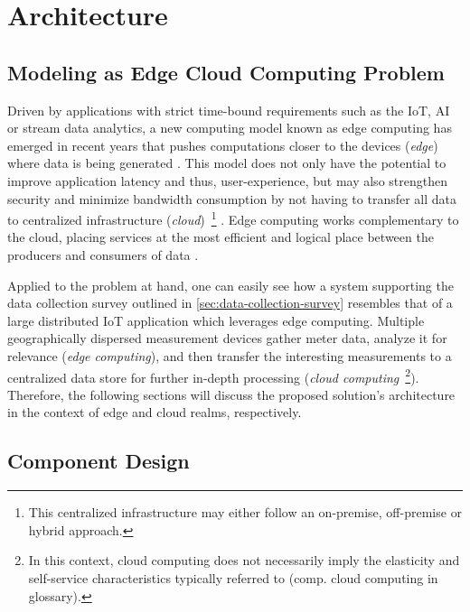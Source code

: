 
\chapter{Architecture}
\label{chp:architecture}

\section{Modeling as Edge Cloud Computing Problem}
\label{sec:modeling-as-edge-cloud-problem}

Driven by applications with strict time-bound requirements such as the \ac{IoT}, \ac{AI} or stream data analytics, a new computing model known as edge computing has emerged in recent years that pushes computations closer to the devices (\textit{edge}) where data is being generated \cite[p.~373]{xiong2018extend} \cite[p.~118]{alam2018orchestration}. This model does not only have the potential to improve application latency and thus, user-experience, but may also strengthen security and minimize bandwidth consumption by not having to transfer all data to centralized infrastructure (\textit{cloud})~\footnote{This centralized infrastructure may either follow an on-premise, off-premise or hybrid approach.} \cite[p.~295]{hoque2017towards}. Edge computing works complementary to the cloud, placing services at the most efficient and logical place between the producers and consumers of data \cite[p.~122]{alam2018orchestration}.

Applied to the problem at hand, one can easily see how a system supporting the data collection survey outlined in \autoref{sec:data-collection-survey} resembles that of a large distributed \ac{IoT} application which leverages edge computing. Multiple geographically dispersed measurement devices gather meter data, analyze it for relevance (\textit{edge computing}), and then transfer the interesting measurements to a centralized data store for further in-depth processing (\textit{cloud computing}~\footnote{In this context, cloud computing does not necessarily imply the elasticity and self-service characteristics typically referred to (comp. \gls{cloud computing} in glossary).}). Therefore, the following sections will discuss the proposed solution's architecture in the context of edge and cloud realms, respectively.


\section{Component Design}
\label{sec:component-design}

